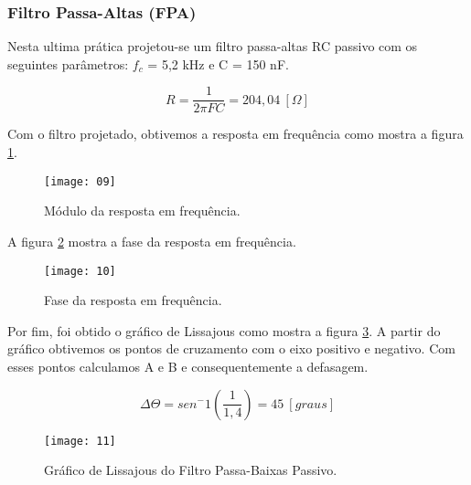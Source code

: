 \subsubsection{Filtro Passa-Altas (FPA)}

Nesta ultima prática projetou-se um filtro passa-altas RC passivo com os seguintes parâmetros: $f_c$ = 5,2 kHz e C = 150 nF.

\[
  R = \frac{1}{2 \pi F C} = 204,04 \ [ \Omega]
\]

Com o filtro projetado, obtivemos a resposta em frequência como mostra a figura \ref{fig:09}.

\begin{figure}[H]
  \centering
  \caption{Módulo da resposta em frequência.}
  \texttt{[image: 09]}
  
  \label{fig:09}
\end{figure}


A figura \ref{fig:10} mostra a fase da resposta em frequência.

\begin{figure}[H]
  \centering
  \caption{Fase da resposta em frequência.}
  \texttt{[image: 10]}
  
  \label{fig:10}
\end{figure}

Por fim, foi obtido o gráfico de Lissajous como mostra a figura \ref{fig:11}. A partir do gráfico obtivemos os pontos de cruzamento com o eixo positivo e negativo. Com esses pontos calculamos A e B e consequentemente a defasagem.

\[
\Delta \Theta = sen^-1 \left(\frac{1}{1,4}\right) = 45 \ [graus]
\]
\begin{figure}[H]
  \centering
  \caption{Gráfico de Lissajous do Filtro Passa-Baixas Passivo.}
  \texttt{[image: 11]}
  
  \label{fig:11}
\end{figure}